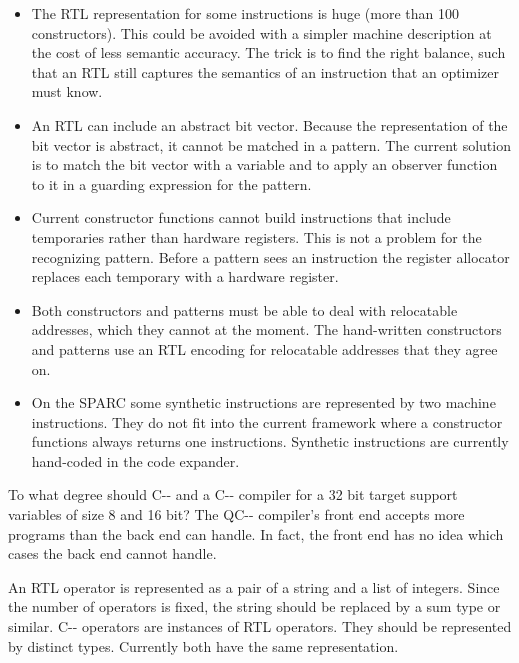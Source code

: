 \documentclass[11pt]{article}
\newcommand\PAL{{\small C-{}-}}
\newcommand\qcc{{\small QC-{}-}}
\newcommand\rtl{{\small RTL}}
\begin{document}
    \begin{itemize} 
    \item The {\rtl} representation for some instructions is huge (more
    than 100 constructors). This could be avoided with a simpler machine
    description at the cost of less semantic accuracy. The trick is to
    find the right balance, such that an {\rtl} still captures the
    semantics of an instruction that an optimizer must know.

    \item An {\rtl} can include an abstract bit vector. Because the
    representation of the bit vector is abstract, it cannot be matched
    in a pattern. The current solution is to match the bit vector with a
    variable and to apply an observer function to it in a guarding
    expression for the pattern.
    
    \item Current constructor functions cannot build instructions that
    include temporaries rather than hardware registers. This is not a
    problem for the recognizing pattern. Before a pattern sees an
    instruction the register allocator replaces each temporary with a
    hardware register.

    \item Both constructors and patterns must be able to deal with
    relocatable addresses, which they cannot at the moment. The
    hand-written constructors and patterns use an {\rtl} encoding for
    relocatable addresses that they agree on.

    \item On the {\small SPARC} some synthetic instructions are
    represented by two machine instructions. They do not fit into the
    current framework where a constructor functions always returns one
    instructions. Synthetic instructions are currently hand-coded in the
    code expander.
    
    \end{itemize}

To what degree should {\PAL} and a {\PAL} compiler for a 32 bit
target support variables of size 8 and 16 bit? The {\qcc} compiler's
front end accepts more programs than the back end can handle. In fact,
the front end has no idea which cases the back end cannot handle. 

An {\rtl} operator is represented as a pair of a string and a list of
integers. Since the number of operators is fixed, the string should be
replaced by a sum type or similar. {\PAL} operators are instances of
{\rtl} operators. They should be represented by distinct types.
Currently both have the same representation.
\end{document}
